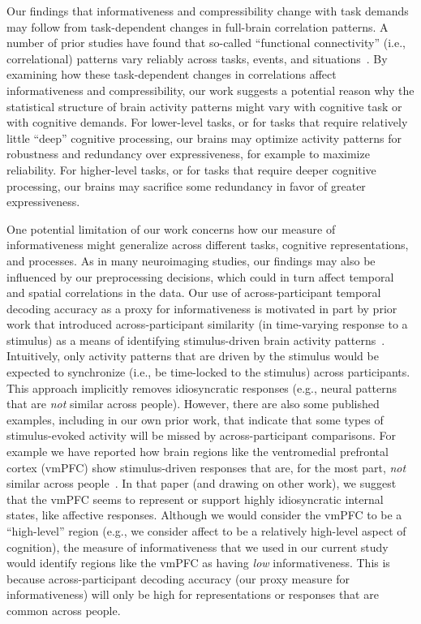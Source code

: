 \documentclass[english, 11pt]{article}
\begin{document}
Our findings that informativeness and compressibility change with task demands
may follow from task-dependent changes in full-brain correlation patterns. A
number of prior studies have found that so-called ``functional connectivity''
(i.e., correlational) patterns vary reliably across tasks, events, and
situations~\citep{SimoEtal16, ColeEtal14, SmitEtal09, OwenEtal21}. By examining
how these task-dependent changes in correlations affect informativeness and
compressibility, our work suggests a potential reason why the statistical
structure of brain activity patterns might vary with cognitive task or with
cognitive demands. For lower-level tasks, or for tasks that require relatively
little ``deep'' cognitive processing, our brains may optimize activity patterns
for robustness and redundancy over expressiveness, for example to maximize
reliability. For higher-level tasks, or for tasks that require deeper cognitive
processing, our brains may sacrifice some redundancy in favor of greater
expressiveness.

One potential limitation of our work concerns how our measure of
informativeness might generalize across different tasks, cognitive
representations, and processes. As in many neuroimaging studies, our findings
may also be influenced by our preprocessing decisions, which could in turn
affect temporal and spatial correlations in the data. Our use of
across-participant temporal decoding accuracy as a proxy for informativeness is
motivated in part by prior work that introduced across-participant similarity
(in time-varying response to a stimulus) as a means of identifying
stimulus-driven brain activity patterns~\citep{SimoEtal16}. Intuitively, only
activity patterns that are driven by the stimulus would be expected to
synchronize (i.e., be time-locked to the stimulus) across participants. This
approach implicitly removes idiosyncratic responses (e.g., neural patterns that
are \textit{not} similar across people). However, there are also some published
examples, including in our own prior work, that indicate that some types of
stimulus-evoked activity will be missed by across-participant comparisons. For
example we have reported how brain regions like the ventromedial prefrontal
cortex (vmPFC) show stimulus-driven responses that are, for the most part,
\textit{not} similar across people~\citep{ChanEtal21a}. In that paper (and
drawing on other work), we suggest that the vmPFC seems to represent or support
highly idiosyncratic internal states, like affective responses. Although we
would consider the vmPFC to be a ``high-level'' region (e.g., we consider
affect to be a relatively high-level aspect of cognition), the measure of
informativeness that we used in our current study would identify regions like
the vmPFC as having \textit{low} informativeness. This is because
across-participant decoding accuracy (our proxy measure for informativeness)
will only be high for representations or responses that are common across
people.
\end{document}
